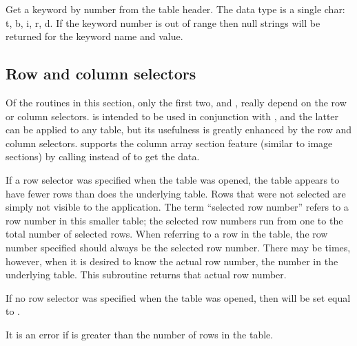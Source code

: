 Get a keyword by number from the table header.
The data type is a single char:  t, b, i, r, d.
If the keyword number is out of range then null strings will be
returned for the keyword name and value.

\callseqtable

\subsection{Row and column selectors}

Of the routines in this section,
only the first two,  and ,
really depend on the row or column selectors.
 is intended to be used in conjunction with ,
and the latter can be applied to any table,
but its usefulness is greatly enhanced by the row and column selectors.
 supports the column array section feature
(similar to image sections)
by calling  instead of 
to get the data.

\begin{callseq}
\end{callseq}

If a row selector was specified when the table was opened,
the table appears to have fewer rows than does the underlying table.
Rows that were not selected are simply not visible to the application.
The term ``selected row number'' refers to a row number
in this smaller table;
the selected row numbers run from one to the total number of selected rows.
When referring to a row in the table,
the row number specified should always be the selected row number.
There may be times, however,
when it is desired to know the actual row number,
the number in the underlying table.
This subroutine returns that actual row number.

If no row selector was specified when the table was opened,
then  will be set equal to .

It is an error if  is greater than
the number of rows in the table.

\callseqtable

\begin{callseq}
\end{callseq}

